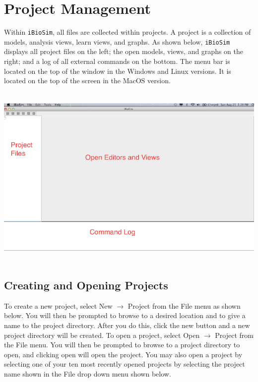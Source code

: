\documentclass[titlepage,11pt]{article}
\begin{document}
\clearpage

\section{Project Management}

\noindent
Within {\tt iBioSim}, all files are collected within projects.   
A project is a collection of models, analysis views, learn views, and graphs.  As shown below, {\tt iBioSim} displays all project files on the left; the open models, views, and graphs on the right; and a log of all external commands on the bottom.  The menu bar is located on the top of the window in the Windows and Linux versions.  It is located on the top of the screen in the MacOS version.

\begin{center}
\includegraphics[height=90mm]{screenshots/iBioSim}
\end{center}

\clearpage

\subsection{Creating and Opening Projects}

\noindent
To create a new project, select New $\rightarrow$ Project from the File menu as shown below.  You will then be prompted to browse to a desired location and to give a name to the project directory.  After you do this, click the new button and a new project directory will be created.  To open a project, select Open $\rightarrow$ Project from the File menu.  You will then be prompted to browse to a project directory to open, and clicking open will open the project. You may also open a project by selecting one of your ten most recently opened projects by selecting the project name shown in the File drop down menu shown below. 
\end{document}
